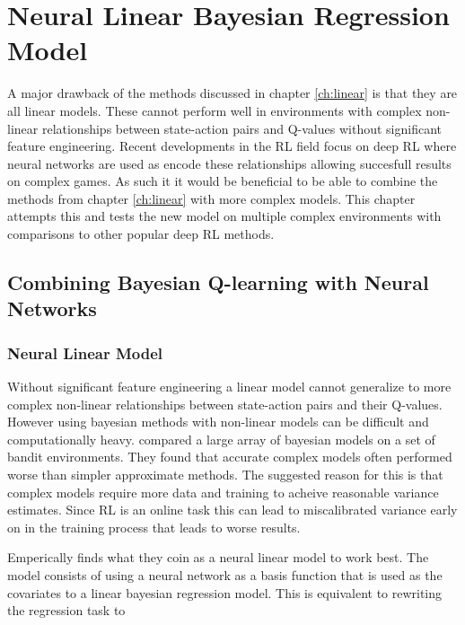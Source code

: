 
\chapter{Neural Linear Bayesian Regression Model}\label{ch:bdqn}

A major drawback of the methods discussed in chapter \ref{ch:linear} is that they are all linear models. These cannot perform well in environments with complex non-linear relationships between state-action pairs and Q-values without significant feature engineering. Recent developments in the RL field focus on deep RL\citep{mnih_2015, mnih_2016,silver_2017} where neural networks are used as encode these relationships allowing succesfull results on complex games. As such it it would be beneficial to be able to combine the methods from chapter \ref{ch:linear} with more complex models. This chapter attempts this and tests the new model on multiple complex environments with comparisons to other popular deep RL methods.

\section{Combining Bayesian Q-learning with Neural Networks}

\subsection{Neural Linear Model}

Without significant feature engineering a linear model cannot generalize to more complex non-linear relationships between state-action pairs and their Q-values. However using bayesian methods with non-linear models can be difficult and computationally heavy. \cite{carlos_2018} compared a large array of bayesian models on a set of bandit environments. They found that accurate complex models often performed worse than simpler approximate methods. The suggested reason for this is that complex models require more data and training to acheive reasonable variance estimates. Since RL is an online task this can lead to miscalibrated variance early on in the training process that leads to worse results.

Emperically \cite{carlos_2018} finds what they coin as a neural linear model to work best. The model consists of using a neural network as a basis function that is used as the covariates to a linear bayesian regression model. This is equivalent to rewriting the regression task to 

